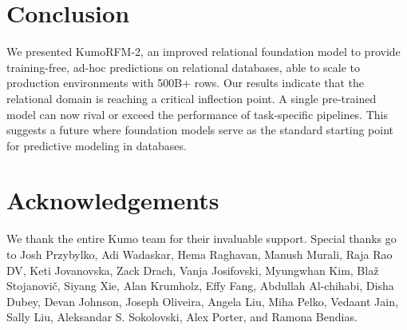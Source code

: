 \documentclass{article}
\newcommand{\twozero}{2\xspace}
\newcommand{\name}{KumoRFM\xspace}
\newcommand{\nametwo}{\name-\twozero}
\begin{document}
\section{Conclusion}
\label{sec:conclusion}

We presented \nametwo, an improved relational foundation model to provide training-free, ad-hoc predictions on relational databases, able to scale to production environments with 500B+ rows.
Our results indicate that the relational domain is reaching a critical inflection point.
A single pre-trained model can now rival or exceed the performance of task-specific pipelines.
This suggests a future where foundation models serve as the standard starting point for predictive modeling in databases.

\section*{Acknowledgements}

We thank the entire Kumo team for their invaluable support.
Special thanks go to Josh Przybylko, Adi Wadaskar, Hema Raghavan, Manush Murali, Raja Rao DV, Keti Jovanovska, Zack Drach, Vanja Josifovski, Myungwhan Kim, Bla\v{z} Stojanovi\v{c}, Siyang Xie, Alan Krumholz, Effy Fang, Abdullah Al-chihabi, Disha Dubey, Devan Johnson, Joseph Oliveira, Angela Liu, Miha Pelko, Vedaant Jain, Sally Liu, Aleksandar S. Sokolovski, Alex Porter, and Ramona Bendias.



\end{document}
